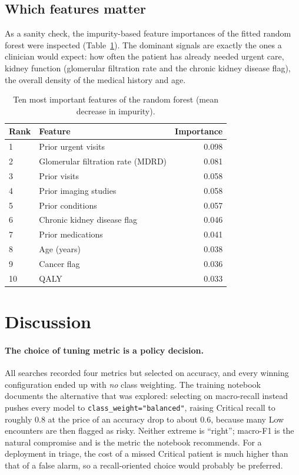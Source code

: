 \documentclass[11pt,a4paper]{article}
\newcommand{\code}[1]{\texttt{\textcolor{codegrey}{#1}}}
\newcommand{\sect}[1]{\section{#1}}
\begin{document}
\subsection{Which features matter}

As a sanity check, the impurity-based feature importances of the fitted random forest were
inspected (Table~\ref{tab:importance}). The dominant signals are exactly the ones a clinician
would expect: how often the patient has already needed urgent care, kidney function (glomerular
filtration rate and the chronic kidney disease flag), the overall density of the medical history
and age.

\begin{table}[H]
\centering\small
\caption{Ten most important features of the random forest (mean decrease in impurity).}
\label{tab:importance}
\begin{tabular}{@{}llr@{}}
\toprule
\textbf{Rank} & \textbf{Feature} & \textbf{Importance} \\
\midrule
1  & Prior urgent visits & 0.098 \\
2  & Glomerular filtration rate (MDRD) & 0.081 \\
3  & Prior visits & 0.058 \\
4  & Prior imaging studies & 0.058 \\
5  & Prior conditions & 0.057 \\
6  & Chronic kidney disease flag & 0.046 \\
7  & Prior medications & 0.041 \\
8  & Age (years) & 0.038 \\
9  & Cancer flag & 0.036 \\
10 & QALY & 0.033 \\
\bottomrule
\end{tabular}
\end{table}

\sect{Discussion}
\label{sec:discussion}

\paragraph{The choice of tuning metric is a policy decision.}
All searches recorded four metrics but selected on accuracy, and every winning configuration
ended up with \emph{no} class weighting. The training notebook documents the alternative that was
explored: selecting on macro-recall instead pushes every model to \code{class\_weight="balanced"},
raising Critical recall to roughly 0.8 at the price of an accuracy drop to about 0.6, because many
Low encounters are then flagged as risky. Neither extreme is ``right''; macro-F1 is the natural
compromise and is the metric the notebook recommends. For a deployment in triage, the cost of a
missed Critical patient is much higher than that of a false alarm, so a recall-oriented choice
would probably be preferred.
\end{document}
